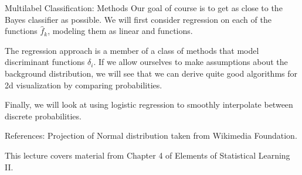 \documentclass[10pt, table, dvipsnames,xcdraw, handout]{beamer}
\begin{document}
\begin{frame}[fragile]{Multilabel Classification: Methods}
Our goal of course is to get as close to the Bayes classifier as possible. We will first consider regression on each of the functions $\hat f_k$, modeling them as linear and functions. \pause

The regression approach is a member of a class of methods that model discriminant functions $\delta_i$. If we allow ourselves to make assumptions about the background distribution, we will see that we can derive quite good algorithms for 2d visualization by comparing probabilities.\pause

Finally, we will look at using logistic regression to smoothly interpolate between discrete probabilities. 
\end{frame}




\begin{frame}[fragile]{References:}
Projection of Normal distribution taken from Wikimedia Foundation. 

This lecture covers material from Chapter 4 of Elements of Statistical Learning II. 


\end{frame}
\end{document}
